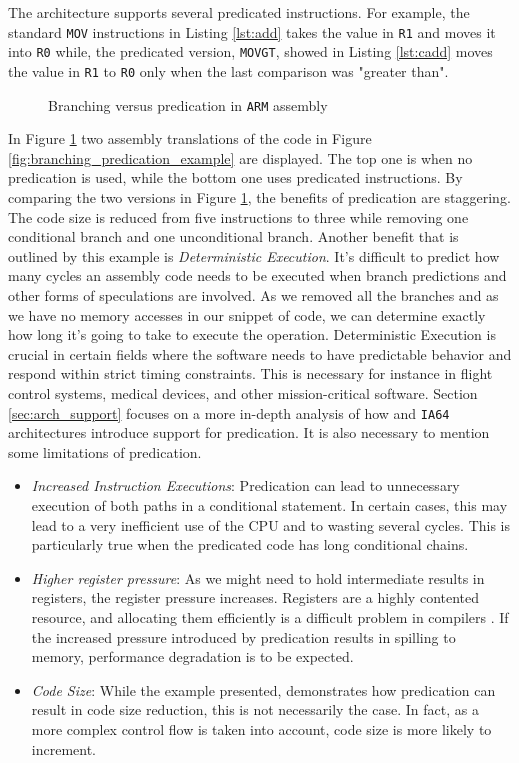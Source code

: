 The \armvs architecture supports several predicated instructions. For example, the standard \texttt{MOV} instructions in Listing \ref{lst:add} takes the value in \texttt{R1} and moves it into \texttt{R0} while, the predicated version, \texttt{MOVGT}, showed in Listing \ref{lst:cadd} moves the value in \texttt{R1} to \texttt{R0} only when the last comparison was "greater than". \\

\begin{figure}[h!]
\centering

\caption{Branching versus predication in \texttt{ARM} assembly}
\label{fig:branching_predication_ARM}
\end{figure}

In Figure \ref{fig:branching_predication_ARM} two assembly translations of the code in Figure \ref{fig:branching_predication_example} are displayed. The top one is when no predication is used, while the bottom one uses predicated instructions.
By comparing the two versions in Figure \ref{fig:branching_predication_ARM}, the benefits of predication are staggering. The code size is reduced from five instructions to three while removing one conditional branch and one unconditional branch. Another benefit that is outlined by this example is \textit{Deterministic Execution}. It's difficult to predict how many cycles an assembly code needs to be executed when branch predictions and other forms of speculations are involved. As we removed all the branches and as we have no memory accesses in our snippet of code, we can determine exactly how long it's going to take to execute the operation. Deterministic Execution is crucial in certain fields where the software needs to have predictable behavior and respond within strict timing constraints. This is necessary for instance in flight control systems, medical devices, and other mission-critical software.
Section \ref{sec:arch_support} focuses on a more in-depth analysis of how \armvs and \texttt{IA64} architectures introduce support for predication. It is also necessary to mention some limitations of predication.
\begin{itemize}
    \item \textit{Increased Instruction Executions}: Predication can lead to unnecessary execution of both paths in a conditional statement. In certain cases, this may lead to a very inefficient use of the CPU and to wasting several cycles. This is particularly true when the predicated code has long conditional chains.
    \item \textit{Higher register pressure}: As we might need to hold intermediate results in registers, the register pressure increases. Registers are a highly contented resource, and allocating them efficiently is a difficult problem in compilers \cite{chaitin1981register}. If the increased pressure introduced by predication results in spilling to memory, performance degradation is to be expected.
    \item \textit{Code Size}: While the example presented,  demonstrates how predication can result in code size reduction, this is not necessarily the case. In fact, as a more complex control flow is taken into account, code size is more likely to increment.
\end{itemize}

